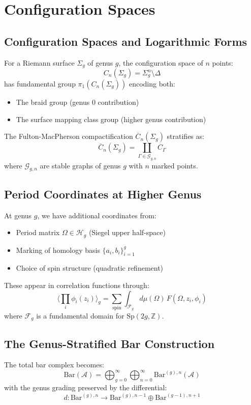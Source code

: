 \chapter{Configuration Spaces}
\section{Configuration Spaces and Logarithmic Forms}


For a Riemann surface $\Sigma_g$ of genus $g$, the configuration space of $n$ points:
$$C_n(\Sigma_g) = \Sigma_g^n \setminus \Delta$$
has fundamental group $\pi_1(C_n(\Sigma_g))$ encoding both:
\begin{itemize}
\item The braid group (genus 0 contribution)
\item The surface mapping class group (higher genus contribution)
\end{itemize}

The Fulton-MacPherson compactification $\overline{C}_n(\Sigma_g)$ stratifies as:
$$\overline{C}_n(\Sigma_g) = \coprod_{\Gamma \in \mathcal{G}_{g,n}} C_{\Gamma}$$
where $\mathcal{G}_{g,n}$ are stable graphs of genus $g$ with $n$ marked points.

\section{Period Coordinates at Higher Genus}

At genus $g$, we have additional coordinates from:
\begin{itemize}
\item Period matrix $\Omega \in \mathcal{H}_g$ (Siegel upper half-space)
\item Marking of homology basis $\{a_i, b_i\}_{i=1}^g$
\item Choice of spin structure (quadratic refinement)
\end{itemize}

These appear in correlation functions through:
$$\langle \prod_i \phi_i(z_i) \rangle_g = \sum_{\text{spin}} \int_{\mathcal{F}_g} d\mu(\Omega) \, F(\Omega, z_i, \phi_i)$$
where $\mathcal{F}_g$ is a fundamental domain for $\text{Sp}(2g, \mathbb{Z})$.

\section{The Genus-Stratified Bar Construction}

The total bar complex becomes:
$$\text{Bar}(\mathcal{A}) = \bigoplus_{g=0}^{\infty} \bigoplus_{n=0}^{\infty} \text{Bar}^{(g),n}(\mathcal{A})$$
with the genus grading preserved by the differential:
$$d: \text{Bar}^{(g),n} \to \text{Bar}^{(g),n-1} \oplus \text{Bar}^{(g-1),n+1}$$

